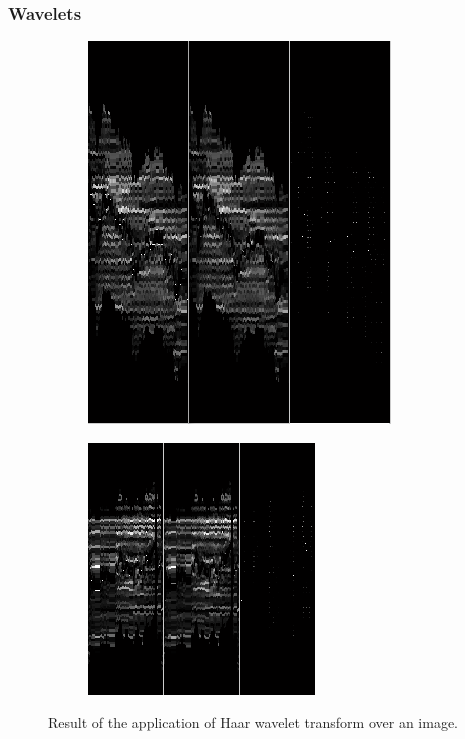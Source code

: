 \documentclass{beamer}
\begin{document}
\begin{frame}
\frametitle{Wavelets}

\begin{figure}
\centering
\begin{subfigure}
  \centering
  		\includegraphics[scale=0.5]{curiositoV1.png}
	\label{fig:curiositoV1}
\end{subfigure}%
\begin{subfigure}
  \centering
\includegraphics[scale=0.5]{curiositoV2.png}
	\label{fig:curiositoV2}
	\end{subfigure}
	\caption{Result of the application of Haar wavelet transform over an image.}
	\label{fig:test}
	\end{figure}
\end{frame}
\end{document}
